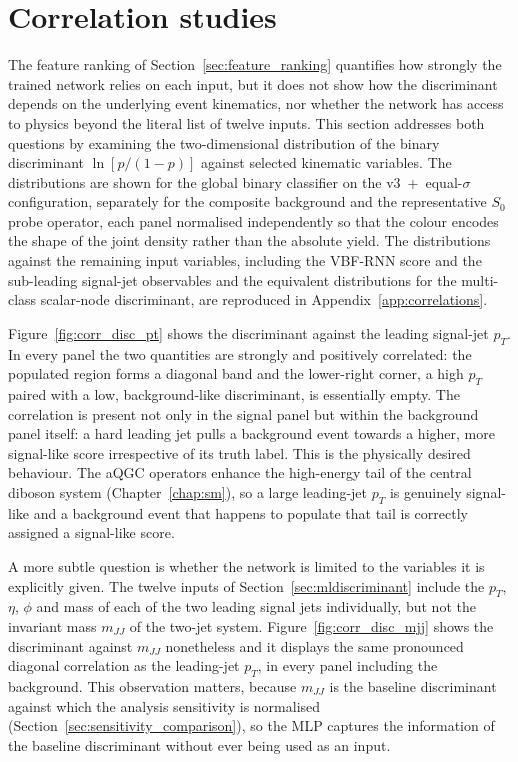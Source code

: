 \section{Correlation studies}
\label{sec:correlation_studies}

The feature ranking of Section~\ref{sec:feature_ranking} quantifies how strongly the trained network relies on each input, but it does not show how the discriminant depends on the underlying event kinematics, nor whether the network has access to physics beyond the literal list of twelve inputs. This section addresses both questions by examining the two-dimensional distribution of the binary discriminant $\ln[p/(1-p)]$ against selected kinematic variables. The distributions are shown for the global binary classifier on the v3~+~equal-$\sigma$ configuration, separately for the composite background and the representative $S_0$ probe operator, each panel normalised independently so that the colour encodes the shape of the joint density rather than the absolute yield. The distributions against the remaining input variables, including the VBF-RNN score and the sub-leading signal-jet observables and the equivalent distributions for the multi-class scalar-node discriminant, are reproduced in Appendix~\ref{app:correlations}.

Figure~\ref{fig:corr_disc_pt} shows the discriminant against the leading signal-jet $p_T$. In every panel the two quantities are strongly and positively correlated: the populated region forms a diagonal band and the lower-right corner, a high $p_T$ paired with a low, background-like discriminant, is essentially empty. The correlation is present not only in the signal panel but within the background panel itself: a hard leading jet pulls a background event towards a higher, more signal-like score irrespective of its truth label. This is the physically desired behaviour. The aQGC operators enhance the high-energy tail of the central diboson system (Chapter~\ref{chap:sm}), so a large leading-jet $p_T$ is genuinely signal-like and a background event that happens to populate that tail is correctly assigned a signal-like score.

A more subtle question is whether the network is limited to the variables it is explicitly given. The twelve inputs of Section~\ref{sec:mldiscriminant} include the $p_T$, $\eta$, $\phi$ and mass of each of the two leading signal jets individually, but not the invariant mass $m_{JJ}$ of the two-jet system. Figure~\ref{fig:corr_disc_mjj} shows the discriminant against $m_{JJ}$ nonetheless and it displays the same pronounced diagonal correlation as the leading-jet $p_T$, in every panel including the background. This observation matters, because $m_{JJ}$ is the baseline discriminant against which the analysis sensitivity is normalised (Section~\ref{sec:sensitivity_comparison}), so the MLP captures the information of the baseline discriminant without ever being used as an input.

